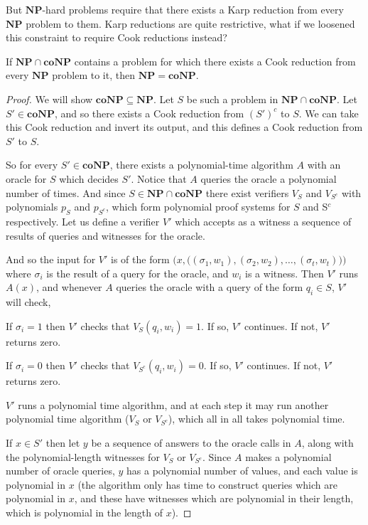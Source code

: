 \documentclass[10pt]{article}
\def\NP{\mathbf{NP}}
\def\coNP{\mathbf{coNP}}
\begin{document}
But $\NP$-hard problems require that there exists a Karp reduction from every $\NP$ problem to them.
Karp reductions are quite restrictive, what if we loosened this constraint to require Cook reductions instead?

\begin{prop*}

    If $\NP\cap\coNP$ contains a problem for which there exists a Cook reduction from every $\NP$ problem to it, then $\NP=\coNP$.

\end{prop*}

\begin{proof}

    We will show $\coNP\subseteq\NP$.
    Let $S$ be such a problem in $\NP\cap\coNP$.
    Let $S'\in\coNP$, and so there exists a Cook reduction from $(S')^c$ to $S$.
    We can take this Cook reduction and invert its output, and this defines a Cook reduction from $S'$ to $S$.

    So for every $S'\in\coNP$, there exists a polynomial-time algorithm $A$ with an oracle for $S$ which decides $S'$.
    Notice that $A$ queries the oracle a polynomial number of times.
    And since $S\in\NP\cap\coNP$ there exist verifiers $V_S$ and $V_{S^c}$ with polynomials $p_S$ and $p_{S^c}$, which form polynomial proof systems for $S$ and S$^c$ respectively.
    Let us define a verifier $V'$ which accepts as a witness a sequence of results of queries and witnesses for the oracle.

    And so the input for $V'$ is of the form $\bigl(x,\bigl((\sigma_1,w_1),(\sigma_2,w_2),\dots,(\sigma_t,w_t)\bigr)\bigr)$ where $\sigma_i$ is the result of a query for the oracle, and $w_i$ is a witness.
    Then $V'$ runs $A(x)$, and whenever $A$ queries the oracle with a query of the form $q_i\in S$, $V'$ will check,
    \benum
        \item If $\sigma_i=1$ then $V'$ checks that $V_S(q_i,w_i)=1$.
        If so, $V'$ continues.
        If not, $V'$ returns zero.
        \item If $\sigma_i=0$ then $V'$ checks that $V_{S^c}(q_i,w_i)=0$.
        If so, $V'$ continues.
        If not, $V'$ returns zero.
    \eenum

    $V'$ runs a polynomial time algorithm, and at each step it may run another polynomial time algorithm ($V_S$ or $V_{S^c}$), which all in all takes polynomial time.

    If $x\in S'$ then let $y$ be a sequence of answers to the oracle calls in $A$, along with the polynomial-length witnesses for $V_S$ or $V_{S^c}$.
    Since $A$ makes a polynomial number of oracle queries, $y$ has a polynomial number of values, and each value is polynomial in $x$ (the algorithm only has time to construct queries which are polynomial in
    $x$, and these have witnesses which are polynomial in their length, which is polynomial in the length of $x$).


\end{proof}
\end{document}

